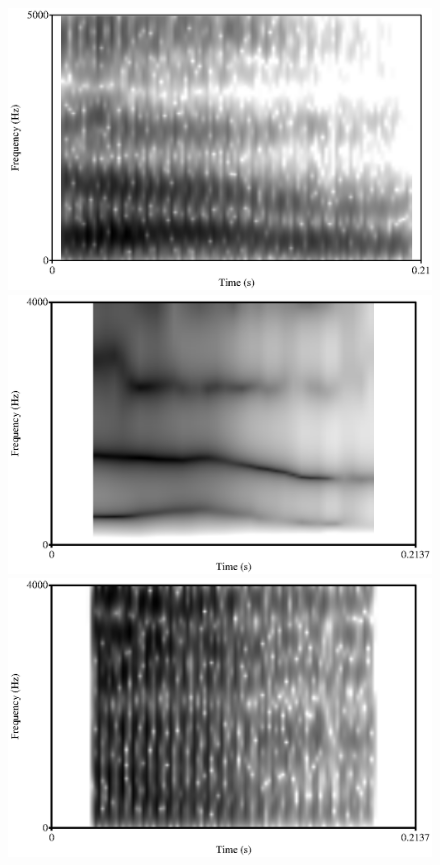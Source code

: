 \documentclass{article}\usepackage[]{graphicx}\usepackage[]{color}
\begin{document}
\begin{figure}
\centering
\includegraphics[scale=0.3,keepaspectratio]{goat.eps}
\includegraphics[scale=0.3,keepaspectratio]{LPC_filter.eps}
\includegraphics[scale=0.3,keepaspectratio]{source.eps}

\end{figure}
\end{document}
